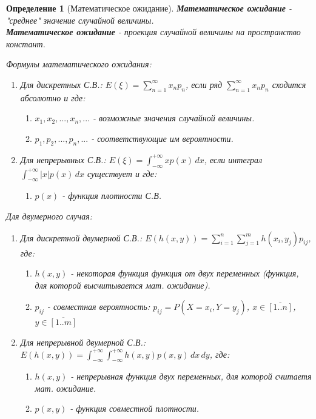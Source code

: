 \documentclass[14pt]{extarticle}
\theoremstyle{breakstyle}
\newtheorem{definition}{Определение}[subsection]
\begin{document}
\begin{definition}[Математическое ожидание]

\textbf{Математическое ожидание} - "среднее" значение случайной величины.\\
\textbf{Математическое ожидание} - проекция случайной величины на пространство констант.

\vspace{\baselineskip}
Формулы математического ожидания:
\begin{enumerate}
    \item Для дискретных С.В.: $E(\xi) = \sum_{n = 1}^{\infty} x_{n}p_{n}$, если ряд $\sum_{n=1}^{\infty} x_{n} p_{n}$ сходится абсолютно и где:
          \begin{enumerate}
              \item $x_{1}, x_{2}, ..., x_{n}, ...$ - возможные значения случайной величины.
              \item $p_{1}, p_{2}, ..., p_{n}, ...$ - соответствующие им вероятности.
          \end{enumerate}
    \item Для непрерывных С.В.: $E(\xi) = \int_{-\infty}^{+\infty} x p(x) \, dx$, если интеграл $\int_{-\infty}^{+\infty} |x| p(x) \, dx$ существует и где:
          \begin{enumerate}
              \item $p(x)$ - функция плотности С.В.
          \end{enumerate}
\end{enumerate}

\vspace{\baselineskip}

Для двумерного случая:
\begin{enumerate}
    \item Для дискретной двумерной С.В.: $E(h(x, y)) = \sum_{i = 1}^{n} \sum_{j = 1}^{m} h(x_{i}, y_{j})p_{ij}$, где:
          \begin{enumerate}
              \item $h(x, y)$ - некоторая функция функция от двух переменных (функция, для которой высчитывается мат. ожидание).
              \item $p_{ij}$ - совместная вероятность: $p_{ij} = P(X = x_{i}, Y = y_{j})$, $x \in \overline{[1..n]}$, $y \in \overline{[1..m]}$
          \end{enumerate}
    \item Для непрерывной двумерной С.В.: $E(h(x, y)) = \int_{-\infty}^{+\infty} \int_{-\infty}^{+\infty} h(x, y) p(x, y) \, dx \, dy$, где:
          \begin{enumerate}
              \item $h(x, y)$ - непрерывная функция двух переменных, для которой считаетя мат. ожидание.
              \item $p(x, y)$ - функция совместной плотности.
          \end{enumerate}
\end{enumerate}


\end{definition}
\end{document}
